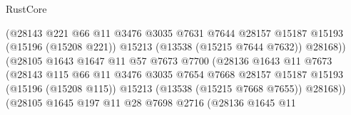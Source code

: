 \begin{lexlean}{RustCore}
\begin{coremodule}
                                          (@28143
                                            @221
                                            @66
                                            @11
                                            @3476
                                            @3035
                                            @7631
                                            @7644
                                            @28157
                                            @15187
                                            @15193
                                            (@15196 (@15208 @221))
                                            @15213
                                            (@13538 (@15215 @7644 @7632))
                                            @28168))
                                        (@28105
                                          @1643
                                          @1647
                                          @11
                                          @57
                                          @7673
                                          @7700
                                          (@28136
                                            @1643
                                            @11
                                            @7673
                                            (@28143
                                              @115
                                              @66
                                              @11
                                              @3476
                                              @3035
                                              @7654
                                              @7668
                                              @28157
                                              @15187
                                              @15193
                                              (@15196 (@15208 @115))
                                              @15213
                                              (@13538 (@15215 @7668 @7655))
                                              @28168))
                                          (@28105
                                            @1645
                                            @197
                                            @11
                                            @28
                                            @7698
                                            @2716
                                            (@28136
                                              @1645
                                              @11

\end{coremodule}
\end{lexlean}
